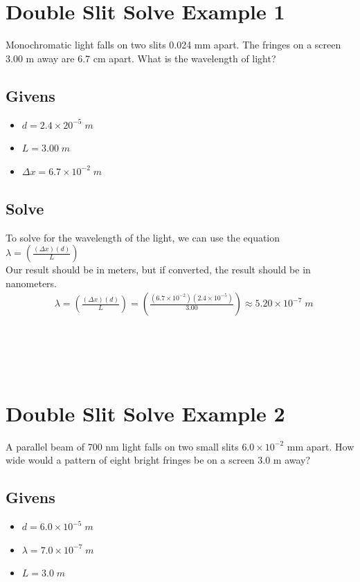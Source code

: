 \documentclass{article}
\begin{document}
\section{Double Slit Solve Example 1}
Monochromatic light falls on two slits 0.024 mm apart. The fringes on a screen 3.00 m away are 6.7 cm apart. What is the wavelength of light?
\subsection*{Givens}
\begin{itemize}
    \item $d = 2.4 \times 20^{-5}\;m$
    \item $L = 3.00\;m $
    \item $\Delta x = 6.7 \times 10^{-2}\;m$
\end{itemize}\leavevmode
\subsection*{Solve}
To solve for the wavelength of the light, we can use the equation $\lambda = \left(\frac{(\Delta x)(d)}{L}\right)$\\ Our result should be in meters, but if converted, the result should be in nanometers.\\
\begin{align*}
     & \lambda = \left(\frac{(\Delta x)(d)}{L}\right)      = \left(\frac{(6.7 \times 10^{-2})(2.4 \times 10^{-5})}{3.00}\right) \approx 5.20 \times 10^{-7}\;m
\end{align*}\leavevmode\\\\\\\\

\section{Double Slit Solve Example 2}
A parallel beam of 700 nm light falls on two small slits $6.0 \times 10^{-2}$ mm apart. How wide would a pattern of eight bright fringes be on a screen 3.0 m away?
\subsection*{Givens}
\begin{itemize}
    \item $d = 6.0 \times 10^{-5}\;m$
    \item $\lambda = 7.0 \times 10^{-7}\;m$
    \item $L = 3.0\;m$
\end{itemize}\leavevmode
\end{document}
